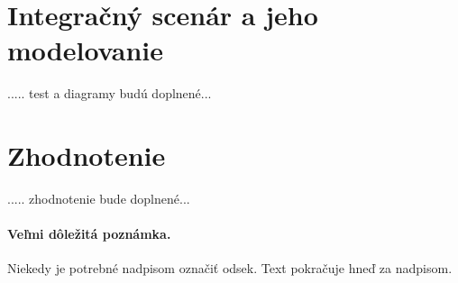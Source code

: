 \documentclass[10pt,twoside,slovak,a4paper]{article}
\begin{document}
\section{Integračný scenár a jeho modelovanie} \label{Integračný}

..... test a diagramy budú doplnené... \\




\section{Zhodnotenie} \label{Zhodnotenie} %
..... zhodnotenie bude doplnené... \\


\paragraph{Veľmi dôležitá poznámka.}
Niekedy je potrebné nadpisom označiť odsek. Text pokračuje hneď za nadpisom.






\end{document}
